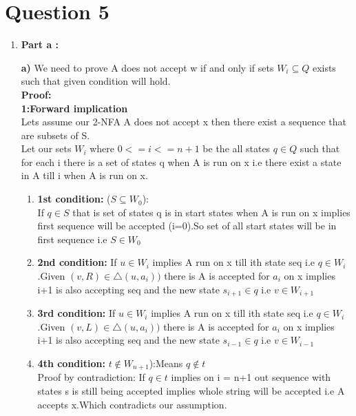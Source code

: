\documentclass{article}
\begin{document}
\section{Question 5}
\begin{enumerate}
    \item \textbf{Part a : }


\textbf{a)} We need to prove A does not accept w if and only if sets $W_i \subseteq Q$ exists such that given condition will hold.\\
\textbf{Proof:}\\
\textbf{1:Forward implication}
\\Lets assume our 2-NFA A does not accept x then there exist a sequence that are subsets of S.\\
Let our sets $W_i$ where $0<=i<=n+1$ be the all states $q \in Q$ such that for each i there is a set of states q when A is run on x i.e there exist a state in A till i when A is run on x.\\

\begin{enumerate}
    \item \textbf{1st condition: }($S \subseteq W_0 $):\\
    If $q \in S $ that is set of states q is in start states  when A is run on x implies first sequence will be accepted (i=0).So set of all start states will be in first sequence  i.e $S \in W_0$\\

    \item \textbf{2nd condition: }
    If $u \in W_i$ implies A run on x till ith state seq i.e $q \in W_i$.Given $(v,R) \in \bigtriangleup(u,a_i))$  there is A is accepted for $a_i$ on x implies i+1 is also accepting seq and the new state $s_{i+1} \in q$ i.e $v \in W_{i+1}$

    \item \textbf{3rd condition: }
    If $u \in W_i$ implies A run on x till ith state seq i.e $q \in W_i$.Given $(v,L) \in \bigtriangleup(u,a_i))$  there is A is accepted for $a_i$ on x implies i+1 is also accepting seq and the new state $s_{i-1} \in q$ i.e $v \in W_{i-1}$\\

    \item \textbf{4th condition: }$t \notin W_{n+1} $):Means $q \notin t$  \\
    Proof by contradiction:
    If $q \in t $ implies on i = n+1 out sequence with states s is still being accepted implies whole string will be accepted i.e A accepts x.Which contradicts our assumption.\\


\end{enumerate}
\end{enumerate}
\end{document}
